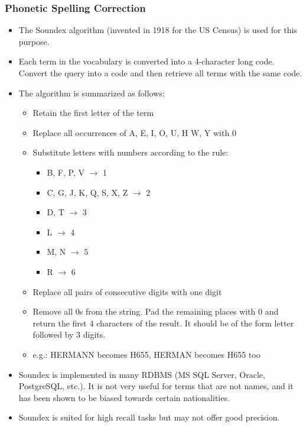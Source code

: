 \documentclass{article}
\begin{document}
\subsubsection{Phonetic Spelling Correction}
\begin{itemize}
    \item The Soundex algorithm (invented in 1918 for the US Census) is used for this purpose. 
    
    \item Each term in the vocabulary is converted into a 4-character long code. Convert the query into a code and then retrieve all terms with the same code. 
    
    \item The algorithm is summarized as follows:
    \begin{itemize}
        \item Retain the first letter of the term
        
        \item Replace all occurrences of A, E, I, O, U, H W, Y with 0
        
        \item Substitute letters with numbers according to the rule:
        \begin{itemize}
            \item B, F, P, V $\rightarrow$ 1
            \item C, G, J, K, Q, S, X, Z $\rightarrow$ 2
            \item D, T $\rightarrow$ 3
            \item L $\rightarrow$ 4
            \item M, N $\rightarrow$ 5
            \item R $\rightarrow$ 6
        \end{itemize}
        
        \item Replace all pairs of consecutive digits with one digit
        
        \item Remove all 0s from the string. Pad the remaining places with 0 and return the first 4 characters of the result. It should be of the form letter followed by 3 digits.
        
        \item e.g.: HERMANN becomes H655, HERMAN becomes H655 too
    \end{itemize}
    
    \item Soundex is implemented in many RDBMS (MS SQL Server, Oracle, PostgreSQL, etc.). It is not very useful for terms that are not names, and it has been shown to be biased towards certain nationalities. 
    
    \item Soundex is suited for high recall tasks but may not offer good precision.
\end{itemize}
\end{document}
